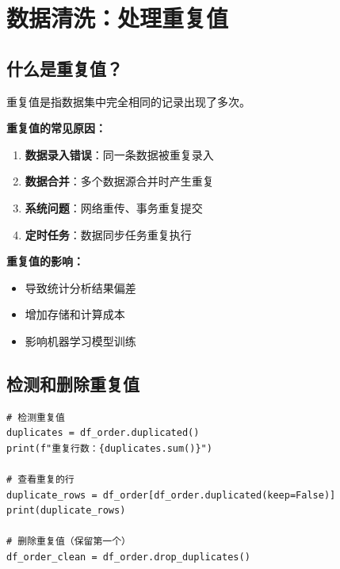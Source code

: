 \documentclass[12pt,a4paper]{article}
\begin{document}
\section{数据清洗：处理重复值}

\subsection{什么是重复值？}

\begin{theorybox}[重复值的产生原因]
重复值是指数据集中完全相同的记录出现了多次。

\textbf{重复值的常见原因：}
\begin{enumerate}
    \item \textbf{数据录入错误}：同一条数据被重复录入
    \item \textbf{数据合并}：多个数据源合并时产生重复
    \item \textbf{系统问题}：网络重传、事务重复提交
    \item \textbf{定时任务}：数据同步任务重复执行
\end{enumerate}

\textbf{重复值的影响：}
\begin{itemize}
    \item 导致统计分析结果偏差
    \item 增加存储和计算成本
    \item 影响机器学习模型训练
\end{itemize}
\end{theorybox}

\subsection{检测和删除重复值}

\begin{lstlisting}[caption={处理重复值}]
# 检测重复值
duplicates = df_order.duplicated()
print(f"重复行数：{duplicates.sum()}")

# 查看重复的行
duplicate_rows = df_order[df_order.duplicated(keep=False)]
print(duplicate_rows)

# 删除重复值（保留第一个）
df_order_clean = df_order.drop_duplicates()
\end{lstlisting}
\end{document}
